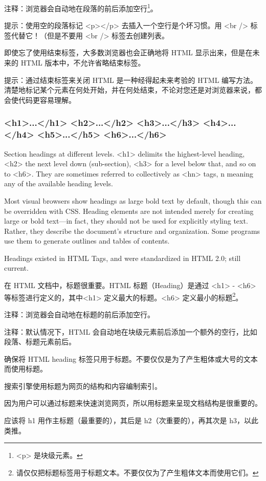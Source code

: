 注释：浏览器会自动地在段落的前后添加空行\footnote{<p> 是块级元素。}。

提示：使用空的段落标记 <p></p> 去插入一个空行是个坏习惯。用 <br /> 标签代替它！（但是不要用 <br /> 标签去创建列表。

即使忘了使用结束标签，大多数浏览器也会正确地将 HTML 显示出来，但是在未来的 HTML 版本中，不允许省略结束标签。

提示：通过结束标签来关闭 HTML 是一种经得起未来考验的 HTML 编写方法。清楚地标记某个元素在何处开始，并在何处结束，不论对您还是对浏览器来说，都会使代码更容易理解。




\subsubsection{<h1>...</h1> <h2>...</h2> <h3>...</h3> <h4>...</h4> <h5>...</h5> <h6>...</h6>}

Section headings at different levels. <h1> delimits the highest-level heading, <h2> the next level down (sub-section), <h3> for a level below that, and so on to <h6>. They are sometimes referred to collectively as <hn> tags, n meaning any of the available heading levels.

Most visual browsers show headings as large bold text by default, though this can be overridden with CSS. Heading elements are not intended merely for creating large or bold text—in fact, they should not be used for explicitly styling text. Rather, they describe the document’s structure and organization. Some programs use them to generate outlines and tables of contents.

Headings existed in HTML Tags, and were standardized in HTML 2.0; still current.

在 HTML 文档中，标题很重要。HTML 标题（Heading）是通过 <h1> - <h6> 等标签进行定义的，其中<h1> 定义最大的标题。<h6> 定义最小的标题\footnote{请仅仅把标题标签用于标题文本。不要仅仅为了产生粗体文本而使用它们。}。

注释：浏览器会自动地在标题的前后添加空行。

注释：默认情况下，HTML 会自动地在块级元素前后添加一个额外的空行，比如段落、标题元素前后。

\begin{compactitem}
\item 确保将 HTML heading 标签只用于标题。不要仅仅是为了产生粗体或大号的文本而使用标题。
\item 搜索引擎使用标题为网页的结构和内容编制索引。
\item 因为用户可以通过标题来快速浏览网页，所以用标题来呈现文档结构是很重要的。
\item 应该将 h1 用作主标题（最重要的），其后是 h2（次重要的），再其次是 h3，以此类推。
\end{compactitem}

